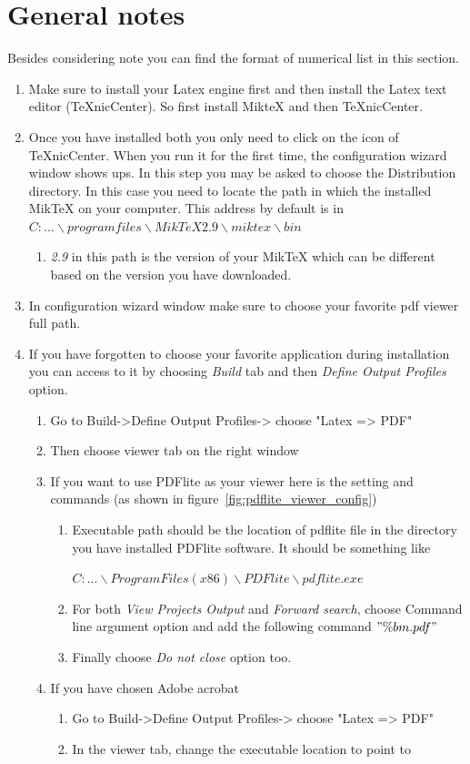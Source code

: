 \documentclass[paper=letter, fontsize=11pt]{scrartcl} %
\numberwithin{equation}{section} %
\numberwithin{figure}{section} %
\numberwithin{table}{section} %
\begin{document}
\section{General notes}
\label{sec:general_notes}
Besides considering note you can find the format of numerical list in this section.
\begin{enumerate}
\item Make sure to install your Latex engine first and then install the Latex text editor (TeXnicCenter). So first install MikteX and then TeXnicCenter.
\item Once you have installed both you only need to click on the icon of TeXnicCenter. When you run it for the first time, the configuration wizard window shows ups. In this step you may be asked to choose the Distribution directory. In this case you need to locate the path in which the installed MikTeX on your computer. 		This address by default is in $C:  . . . \backslash programfiles \backslash MikTeX2.9 \backslash miktex \backslash bin$
	\begin {enumerate}
	\item \textit{2.9} in this path is the version of your MikTeX which can be different based on the version you have downloaded.
	\end {enumerate}
\item In configuration wizard window make sure to choose your favorite pdf viewer full path. 
\item If you have forgotten to choose your favorite application during installation you can access to it by choosing \textit{Build} tab and then \textit{Define Output Profiles} option.
	\begin {enumerate}
	\item Go to Build->Define Output Profiles-> choose "Latex => PDF"
	\item Then choose viewer tab on the right window
	\item If you want to use PDFlite as your viewer here is the setting and commands (as shown in figure~\ref{fig:pdflite_viewer_config})
	\begin {enumerate}
	\item Executable path should be the location of pdflite file in the directory you have installed PDFlite software. It should be something like
	
	$C: . . . \backslash Program Files (x86) \backslash  PDFlite \backslash  pdflite.exe$
	\item For both \textit{View Projects Output} and \textit{Forward search}, choose Command line argument option and add the following command
	$"\%bm.pdf"$
	\item Finally choose \textit{Do not close} option too.
	\end {enumerate}
	\item If you have chosen Adobe acrobat
		\begin{enumerate}
		\item Go to Build->Define Output Profiles-> choose "Latex => PDF"
		\item In the viewer tab, change the executable location to point to
		

\end{enumerate}
\end{enumerate}
\end{enumerate}
\end{document}
